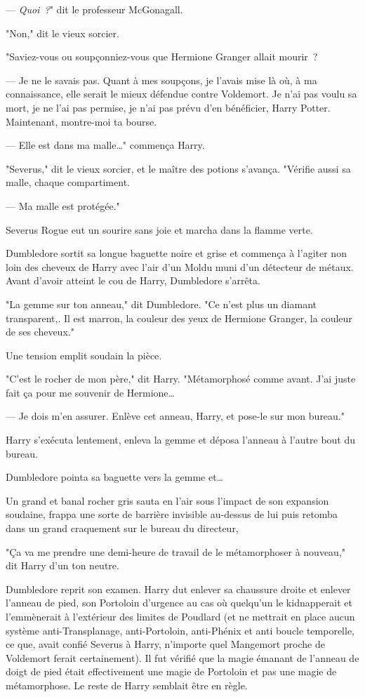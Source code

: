 --- \emph{Quoi~?}" dit le professeur McGonagall.

"Non," dit le vieux sorcier.

"Saviez-vous ou soupçonniez-vous que Hermione Granger allait mourir~?

--- Je ne le savais pas. Quant à mes soupçons, je l'avais mise là où, à ma connaissance, elle serait le mieux défendue contre Voldemort. Je n'ai pas voulu sa mort, je ne l'ai pas permise, je n'ai pas prévu d'en bénéficier, Harry Potter. Maintenant, montre-moi ta bourse.

--- Elle est dans ma malle…" commença Harry.

"Severus," dit le vieux sorcier, et le maître des potions s'avança. "Vérifie aussi sa malle, chaque compartiment.

--- Ma malle est protégée."

Severus Rogue eut un sourire sans joie et marcha dans la flamme verte.

Dumbledore sortit sa longue baguette noire et grise et commença à l'agiter non loin des cheveux de Harry avec l'air d'un Moldu muni d'un détecteur de métaux. Avant d'avoir atteint le cou de Harry, Dumbledore s'arrêta.

"La gemme sur ton anneau," dit Dumbledore. "Ce n'est plus un diamant transparent,. Il est marron, la couleur des yeux de Hermione Granger, la couleur de ses cheveux."

Une tension emplit soudain la pièce.

"C'est le rocher de mon père," dit Harry. "Métamorphosé comme avant. J'ai juste fait ça pour me souvenir de Hermione…

--- Je dois m'en assurer. Enlève cet anneau, Harry, et pose-le sur mon bureau."

Harry s'exécuta lentement, enleva la gemme et déposa l'anneau à l'autre bout du bureau.

Dumbledore pointa sa baguette vers la gemme et…

Un grand et banal rocher gris sauta en l'air sous l'impact de son expansion soudaine, frappa une sorte de barrière invisible au-dessus de lui puis retomba dans un grand craquement sur le bureau du directeur,

"Ça va me prendre une demi-heure de travail de le métamorphoser à nouveau," dit Harry d'un ton neutre.

Dumbledore reprit son examen. Harry dut enlever sa chaussure droite et enlever l'anneau de pied, son Portoloin d'urgence au cas où quelqu'un le kidnapperait et l'emmènerait à l'extérieur des limites de Poudlard (et ne mettrait en place aucun système anti-Transplanage, anti-Portoloin, anti-Phénix et anti boucle temporelle, ce que, avait confié Severus à Harry, n'importe quel Mangemort proche de Voldemort ferait certainement). Il fut vérifié que la magie émanant de l'anneau de doigt de pied était effectivement une magie de Portoloin et pas une magie de métamorphose. Le reste de Harry semblait être en règle.

